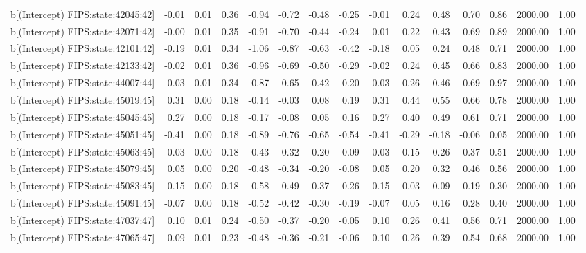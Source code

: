 \begin{table}[ht]
\begin{tabular}{rrrrrrrrrrrrrrr}
  b[(Intercept) FIPS:state:42045:42] & -0.01 & 0.01 & 0.36 & -0.94 & -0.72 & -0.48 & -0.25 & -0.01 & 0.24 & 0.48 & 0.70 & 0.86 & 2000.00 & 1.00 \\ 
  b[(Intercept) FIPS:state:42071:42] & -0.00 & 0.01 & 0.35 & -0.91 & -0.70 & -0.44 & -0.24 & 0.01 & 0.22 & 0.43 & 0.69 & 0.89 & 2000.00 & 1.00 \\ 
  b[(Intercept) FIPS:state:42101:42] & -0.19 & 0.01 & 0.34 & -1.06 & -0.87 & -0.63 & -0.42 & -0.18 & 0.05 & 0.24 & 0.48 & 0.71 & 2000.00 & 1.00 \\ 
  b[(Intercept) FIPS:state:42133:42] & -0.02 & 0.01 & 0.36 & -0.96 & -0.69 & -0.50 & -0.29 & -0.02 & 0.24 & 0.45 & 0.66 & 0.83 & 2000.00 & 1.00 \\ 
  b[(Intercept) FIPS:state:44007:44] & 0.03 & 0.01 & 0.34 & -0.87 & -0.65 & -0.42 & -0.20 & 0.03 & 0.26 & 0.46 & 0.69 & 0.97 & 2000.00 & 1.00 \\ 
  b[(Intercept) FIPS:state:45019:45] & 0.31 & 0.00 & 0.18 & -0.14 & -0.03 & 0.08 & 0.19 & 0.31 & 0.44 & 0.55 & 0.66 & 0.78 & 2000.00 & 1.00 \\ 
  b[(Intercept) FIPS:state:45045:45] & 0.27 & 0.00 & 0.18 & -0.17 & -0.08 & 0.05 & 0.16 & 0.27 & 0.40 & 0.49 & 0.61 & 0.71 & 2000.00 & 1.00 \\ 
  b[(Intercept) FIPS:state:45051:45] & -0.41 & 0.00 & 0.18 & -0.89 & -0.76 & -0.65 & -0.54 & -0.41 & -0.29 & -0.18 & -0.06 & 0.05 & 2000.00 & 1.00 \\ 
  b[(Intercept) FIPS:state:45063:45] & 0.03 & 0.00 & 0.18 & -0.43 & -0.32 & -0.20 & -0.09 & 0.03 & 0.15 & 0.26 & 0.37 & 0.51 & 2000.00 & 1.00 \\ 
  b[(Intercept) FIPS:state:45079:45] & 0.05 & 0.00 & 0.20 & -0.48 & -0.34 & -0.20 & -0.08 & 0.05 & 0.20 & 0.32 & 0.46 & 0.56 & 2000.00 & 1.00 \\ 
  b[(Intercept) FIPS:state:45083:45] & -0.15 & 0.00 & 0.18 & -0.58 & -0.49 & -0.37 & -0.26 & -0.15 & -0.03 & 0.09 & 0.19 & 0.30 & 2000.00 & 1.00 \\ 
  b[(Intercept) FIPS:state:45091:45] & -0.07 & 0.00 & 0.18 & -0.52 & -0.42 & -0.30 & -0.19 & -0.07 & 0.05 & 0.16 & 0.28 & 0.40 & 2000.00 & 1.00 \\ 
  b[(Intercept) FIPS:state:47037:47] & 0.10 & 0.01 & 0.24 & -0.50 & -0.37 & -0.20 & -0.05 & 0.10 & 0.26 & 0.41 & 0.56 & 0.71 & 2000.00 & 1.00 \\ 
  b[(Intercept) FIPS:state:47065:47] & 0.09 & 0.01 & 0.23 & -0.48 & -0.36 & -0.21 & -0.06 & 0.10 & 0.26 & 0.39 & 0.54 & 0.68 & 2000.00 & 1.00 \\ 

\end{tabular}
\end{table}
